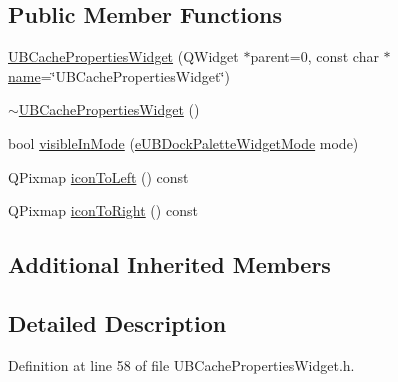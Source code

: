 \subsection*{Public Member Functions}
\begin{DoxyCompactItemize}
\item 
\hyperlink{class_u_b_cache_properties_widget_aa3bc851e2fa188c9fcdb460eb0cdcadd}{U\-B\-Cache\-Properties\-Widget} (Q\-Widget $\ast$parent=0, const char $\ast$\hyperlink{class_u_b_dock_palette_widget_a1c7779c0584c0d2541b4c05acc1ffbbb}{name}=\char`\"{}U\-B\-Cache\-Properties\-Widget\char`\"{})
\item 
\hyperlink{class_u_b_cache_properties_widget_ae54d0ce17412cef4097bf0cac5658e15}{$\sim$\-U\-B\-Cache\-Properties\-Widget} ()
\item 
bool \hyperlink{class_u_b_cache_properties_widget_a2b1361d809a0419327fe6465a6b8edcd}{visible\-In\-Mode} (\hyperlink{_u_b_dock_palette_widget_8h_af3b2828ed1bf91ad13c73e4e1b3b529e}{e\-U\-B\-Dock\-Palette\-Widget\-Mode} mode)
\item 
Q\-Pixmap \hyperlink{class_u_b_cache_properties_widget_a682048aab160c3d4fea70963e592418b}{icon\-To\-Left} () const 
\item 
Q\-Pixmap \hyperlink{class_u_b_cache_properties_widget_a1b60da7de1885e6bb6ef349aba6fd738}{icon\-To\-Right} () const 
\end{DoxyCompactItemize}
\subsection*{Additional Inherited Members}


\subsection{Detailed Description}


Definition at line 58 of file U\-B\-Cache\-Properties\-Widget.\-h.



